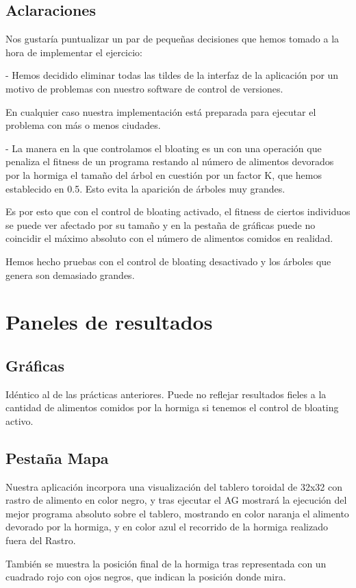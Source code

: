 \documentclass{article}
\begin{document}
\subsection{Aclaraciones}
Nos gustaría puntualizar un par de pequeñas decisiones que hemos tomado a la hora de implementar el ejercicio:\par
\bigskip
\quad- Hemos decidido eliminar todas las tildes de la interfaz de la aplicación por un motivo de problemas con nuestro software de control de versiones.\par En cualquier caso nuestra implementación está preparada para ejecutar el problema con más o menos ciudades.\par
\bigskip
\quad- La manera en la que controlamos el bloating es un con una operación que penaliza el fitness de un programa restando al número de alimentos devorados por la hormiga el tamaño del árbol en cuestión por un factor K, que hemos establecido en 0.5. Esto evita la aparición de árboles muy grandes. \par Es por esto que con el control de bloating activado, el fitness de ciertos individuos se puede ver afectado por su tamaño y en la pestaña de gráficas puede no coincidir el máximo absoluto con el número de alimentos comidos en realidad. \par Hemos hecho pruebas con el control de bloating desactivado y los árboles que genera son demasiado grandes.

\newpage
\section{Paneles de resultados}

\subsection{Gráficas}
Idéntico al de las prácticas anteriores. Puede no reflejar resultados fieles a la cantidad de alimentos comidos por la hormiga si tenemos el control de bloating activo.
\subsection{Pestaña Mapa}
Nuestra aplicación incorpora una visualización del tablero toroidal de 32x32 con rastro de alimento en color negro, y tras ejecutar el AG mostrará la ejecución del mejor programa absoluto sobre el tablero, mostrando en color naranja el alimento devorado por la hormiga, y en color azul el recorrido de la hormiga realizado fuera del Rastro.\par También se muestra la posición final de la hormiga tras representada con un cuadrado rojo con ojos negros, que indican la posición donde mira.
\end{document}
